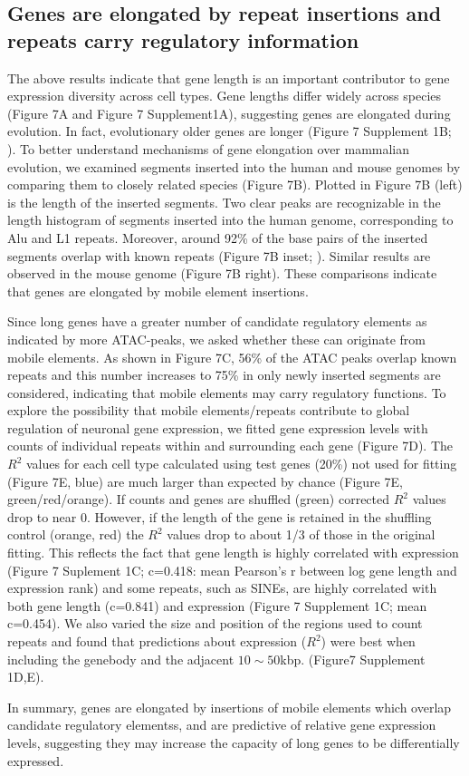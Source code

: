 \subsection{Genes are elongated by repeat insertions and repeats carry regulatory information}

The above results indicate that gene length is an important contributor to gene expression diversity across cell types. Gene lengths differ widely across species (Figure 7A and Figure 7 Supplement1A), suggesting genes are elongated during evolution. In fact, evolutionary older genes are longer (Figure 7 Supplement 1B; \cite{Grishkevich_2014}). To better understand mechanisms of gene elongation over mammalian evolution, we examined segments inserted into the human and mouse genomes by comparing them to closely related species (Figure 7B). Plotted in Figure 7B (left) is the length of the inserted segments. Two clear peaks are recognizable in the length histogram of segments inserted into the human genome, corresponding to Alu and L1 repeats. Moreover, around 92\% of the base pairs of the inserted segments overlap with known repeats (Figure 7B inset; \cite{Hubley_2015}). Similar results are observed in the mouse genome (Figure 7B right). These comparisons indicate that genes are elongated by mobile element insertions. 

Since long genes have a greater number of candidate regulatory elements as indicated by more ATAC-peaks, we asked whether these can originate from mobile elements. As shown in Figure 7C, 56\% of the ATAC peaks overlap known repeats and this number increases to 75\% in only newly inserted segments are considered, indicating that mobile elements may carry regulatory functions. To explore the possibility that mobile elements/repeats contribute to global regulation of  neuronal gene expression, we fitted gene expression levels with  counts of individual repeats within  and surrounding each gene (Figure 7D).  The $R^2$ values for each cell type calculated using test genes (20\%) not used for fitting (Figure 7E, blue) are much larger than expected by chance (Figure 7E, green/red/orange). If counts and genes are shuffled (green) corrected $R^2$ values drop to near 0. However, if the length of the gene is retained in the shuffling control (orange, red) the $R^2$ values drop to about 1/3 of those in the original fitting. This reflects the fact that gene length is highly correlated with expression (Figure 7 Suplement 1C; c=0.418: mean Pearson's r between log gene length and expression rank) and some repeats, such as SINEs, are highly correlated with both gene length (c=0.841) and expression (Figure 7 Supplement 1C; mean c=0.454). We also varied the size and position of the regions used to count repeats and found that predictions about expression ($R^2$) were best when including the genebody and the adjacent $10\sim 50$kbp. (Figure7 Supplement 1D,E). 

In summary, genes are elongated by insertions of mobile elements which overlap candidate regulatory elementss, and are predictive of relative gene expression levels, suggesting they may increase the capacity of long genes to be differentially expressed. 


